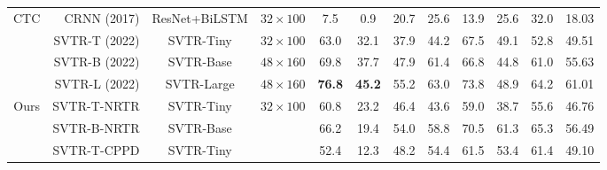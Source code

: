 \documentclass[10pt,journal,compsoc]{IEEEtran}
\begin{document}
\begin{table*}[t]
{\begin{tabular}{c|r|c|c|ccccccc|c}
                      \hline
\multirow{4}{*}{CTC}  & CRNN  \cite{shi2017crnn} (2017)  & ResNet+BiLSTM  & $32\times100$       & 7.5                  & 0.9                                                       & 20.7                 & 25.6                 & 13.9                 & 25.6                                                   & 32.0                 & 18.03                                             \\
                      & SVTR-T \cite{duijcai2022svtr} (2022) & SVTR-Tiny   & $32\times100$      & 63.0                 & 32.1                                                      & 37.9                 & 44.2                 & 67.5                 & 49.1                                                   & 52.8                 & 49.51                                             \\
                      & SVTR-B \cite{duijcai2022svtr} (2022) & SVTR-Base   & $48\times160$      &    69.8                  &   37.7                                                        &  47.9                    &     61.4                 &   66.8                   &   44.8                                                     &  61.0                    & 55.63                                                  \\
                      & SVTR-L \cite{duijcai2022svtr} (2022)  & SVTR-Large   & $48\times160$      &    \textbf{76.8}     &   \textbf{45.2}   &  55.2  &  63.0  &   73.8     &    48.9  & 64.2    &   61.01                                                \\
\hline
\multirow{5}{*}{Ours}  & SVTR-T-NRTR   & SVTR-Tiny   & \multirow{4}{*}{$32\times100$}     & 60.8                 & 23.2                                                      & 46.4                 & 43.6                 & 59.0                 & 38.7                                                   & 55.6                 & 46.76                                             \\
                      & SVTR-B-NRTR   & SVTR-Base  &   & 66.2                 & 19.4                                                      & 54.0                 & 58.8                 & 70.5                 & 61.3                                                   & 65.3                 & 56.49                                             \\
                      & SVTR-T-CPPD   & SVTR-Tiny   &  & 52.4                 & 12.3                                                      & 48.2                 & 54.4                 & 61.5                 & 53.4                                                   & 61.4                 & 49.10                                             \\

\end{tabular}}
\end{table*}
\end{document}
